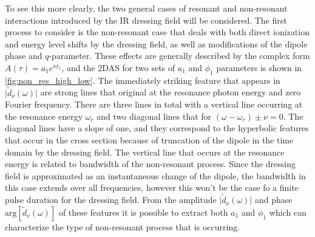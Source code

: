 To see this more clearly, the two general cases of resonant and non-resonant interactions introduced by the IR dressing field will be considered.  The first process to consider is the non-resonant case that deals with both direct ionization and energy level shifts by the dressing field, as well as modifications of the dipole phase and $q$-parameter.  These effects are generally described by the complex form $A(\tau)=a_1e^{i\phi_1}$, and the 2DAS for two sets of $a_1$ and $\phi_1$ parameters is shown in \ref{fig:non_res_high_low}. The immediately striking feature that appears in $\rvert\tilde{d}_\nu(\omega)\lvert$ are strong lines that original at the resonance photon energy and zero Fourier frequency.  There are three lines in total with a vertical line occurring at the resonance energy $\omega_r$  and two diagonal lines that for $(\omega-\omega_r)\pm\nu=0$. The diagonal lines have a slope of one, and they correspond to the hyperbolic features that occur in the cross section because of truncation of the dipole in the time domain by the dressing field.  The vertical line that occurs at the resonance energy is related to bandwidth of the non-resonant process.  Since the dressing field is approximated as an instantaneous change of the dipole, the bandwidth in this case extends over all frequencies, however this won't be the case fo a finite pulse duration for the dressing field.  From the amplitude $\rvert\tilde{d}_\nu(\omega)\lvert$ and phase $\mathrm{arg}[\tilde{d}_\nu(\omega)]$ of these features it is possible to extract both $a_1$ and $\phi_1$ which can characterize the type of non-resonant process that is occurring. 
